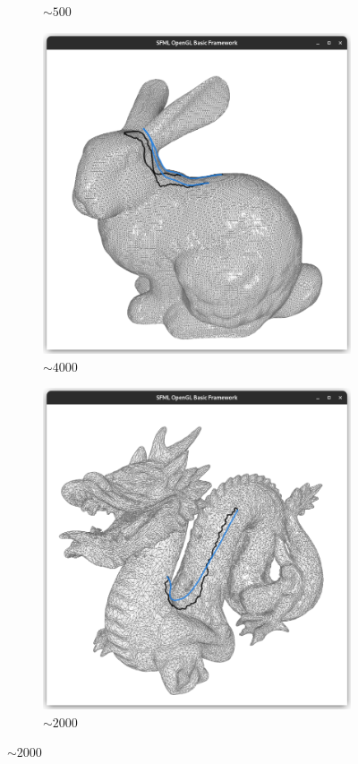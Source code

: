 \documentclass{stdlocal}
\begin{document}
\begin{figure}
\begin{subfigure}[b]{0.24\linewidth}
    \caption{$\sim 500$}
  \end{subfigure}
  \begin{subfigure}[b]{0.24\linewidth}
    \centering
    \includegraphics[width=\linewidth,trim={15px 20 15 50},clip]{images/bunny-geodesic-1.png}
    \caption{$\sim 4000$}
  \end{subfigure}
  \begin{subfigure}[b]{0.24\linewidth}
    \centering
    \includegraphics[width=\linewidth,trim={15px 20 15 50},clip]{images/dragon-geodesic-1.png}
    \caption{$\sim 2000$}
  \end{subfigure}


\end{figure}
\end{document}
